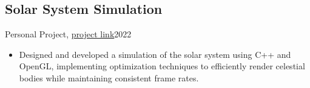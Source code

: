 \subsection{Solar System Simulation}{Personal Project, \href{https://github.com/Danial-Kord/Solar-System-OpenGL}{project link}}{2022}
\begin{itemize}
    \item Designed and developed a simulation of the solar system using C++ and OpenGL, implementing optimization techniques to efficiently render celestial bodies while maintaining consistent frame rates.
\end{itemize}
